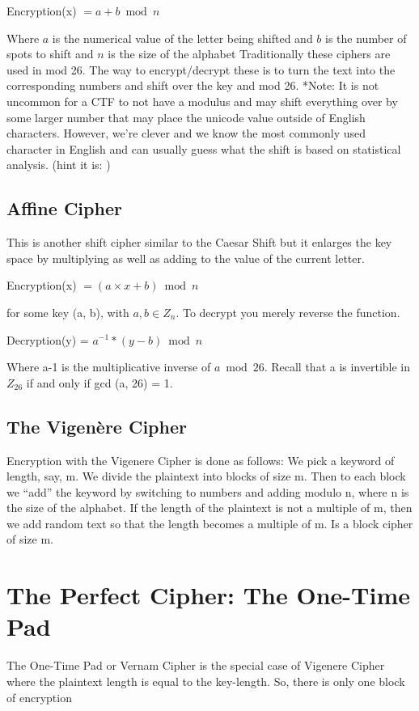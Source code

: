 \documentclass{report}
\begin{document}
Encryption(x) \(= a + b \bmod n \)

Where \(a\) is the numerical value of the letter being shifted and \(b\) is the number of spots to shift and \(n\) is the size of the alphabet 
\newline
\newline
Traditionally these ciphers are used in mod 26.  The way to encrypt/decrypt these is to turn the text into the corresponding numbers and shift over the key and mod 26.
*Note: It is not uncommon for a CTF to not have a modulus and may shift everything over by some larger number that may place the unicode value outside of English characters. However, we’re clever and we know the most commonly used character in English and can usually guess what the shift is based on statistical analysis. (hint it is:  )
\subsection{Affine Cipher}
This is another shift cipher similar to the Caesar Shift but it enlarges the key space by multiplying as well as adding to the value of the current letter. \newline \newline

Encryption(x) \(= (a\times x + b) \bmod n\)

for some key (a, b), with $a, b \in Z_n$.  To decrypt you merely reverse the function.

Decryption(y) = $a^{-1}*(y - b) \bmod n$

Where a-1 is the multiplicative inverse of $a \bmod 26$.\newline
Recall that a is invertible in $Z_26$ if and only if gcd (a, 26) = 1.

\subsection{The Vigenère Cipher}
Encryption with the \color{blue} Vigenere Cipher \color{black} is done as follows: We pick a keyword of length, say, m. We divide the plaintext into blocks of size m. Then to each block we “add” the keyword by switching to numbers and adding modulo n, where n is the size of the alphabet. If the length of the plaintext is not a multiple of m, then we add random text so that the length becomes a multiple of m.  Is a block cipher of size m.

\section{The Perfect Cipher: The One-Time Pad}
The \color{blue} One-Time Pad \color{black} or \color{blue} Vernam Cipher \color{black} is the 
special case of Vigenere Cipher where the plaintext length is equal to the key-length.  So, 
there is only one block of encryption
\end{document}
